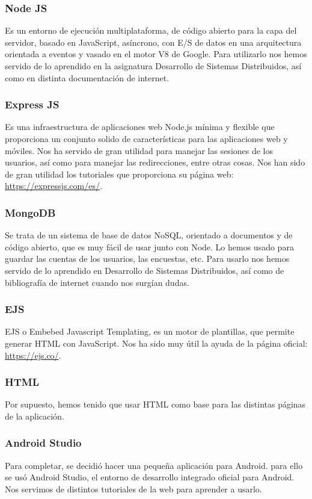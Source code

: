 \documentclass{article}
\begin{document}
 	\subsubsection{Node JS}
 	Es un entorno de ejecución multiplataforma, de código abierto para la capa del servidor, basado en JavaScript, asíncrono, con E/S de datos en una arquitectura orientada a eventos y vasado en el motor V8 de Google. Para utilizarlo nos hemos servido de lo aprendido en la asignatura Desarrollo de Sistemas Distribuidos, así como en distinta documentación de internet.
 	\subsubsection{Express JS}
 	Es una infraestructura de aplicaciones web Node.js mínima y flexible que proporciona un conjunto solido de características para las aplicaciones web y móviles. Nos ha servido de gran utilidad para manejar las sesiones de los usuarios, así como para manejar las redirecciones, entre otras cosas. Nos han sido de gran utilidad los tutoriales que proporciona su página web: \url{https://expressjs.com/es/}.
 	\subsubsection{MongoDB}
 	Se trata de un sistema de base de datos NoSQL, orientado a documentos y de código abierto, que es muy fácil de usar junto con Node. Lo hemos usado para guardar las cuentas de los usuarios, las encuestas, etc. Para usarlo nos hemos servido de lo aprendido en Desarrollo de Sistemas Distribuidos, así como de bibliografía de internet cuando nos surgían dudas.
 	\subsubsection{EJS}
 	EJS o Embebed Javascript Templating, es un motor de plantillas, que permite generar HTML con JavaScript. Nos ha sido muy útil la ayuda de la página oficial: \url{https://ejs.co/}.
 	\subsubsection{HTML}
 	Por supuesto, hemos tenido que usar HTML como base para las distintas páginas de la aplicación.
 	\subsubsection{Android Studio}
 	Para completar, se decidió hacer una pequeña aplicación para Android. para ello se usó Android Studio, el entorno de desarrollo integrado oficial para Android. Nos servimos de distintos tutoriales de la web para aprender a usarlo. 
 	
\end{document}
